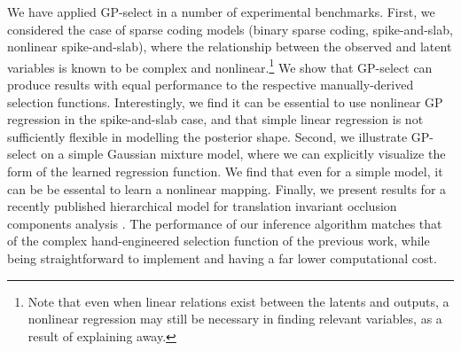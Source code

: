 We have applied GP-select in a number of experimental benchmarks.
First, we considered the case of sparse coding models (binary sparse coding,
spike-and-slab, nonlinear spike-and-slab), where the relationship between the
observed and latent variables is known to be complex and nonlinear.\footnote{Note that
 even when linear relations exist between the latents and outputs, a nonlinear
regression may still be necessary in finding relevant variables,
as a result of explaining away.}
%
We show that GP-select can produce results with equal performance to the respective manually-derived selection functions.
%
Interestingly, we find it can be essential to use nonlinear GP regression
in the spike-and-slab case, and that simple linear regression is not
sufficiently flexible in modelling the posterior shape.
%
Second, we illustrate GP-select on a simple Gaussian mixture model,
where we can explicitly visualize the form of the learned regression function.
We find that even for a simple model, it can be be essental to learn a nonlinear mapping.
%
Finally, we present results
for a recently published hierarchical model for  translation invariant occlusion components analysis
\citep{DaiLucke2014}.
The performance of our inference algorithm matches that of the complex
hand-engineered selection function of the previous work, while being straightforward
to implement and having a far lower computational cost.



